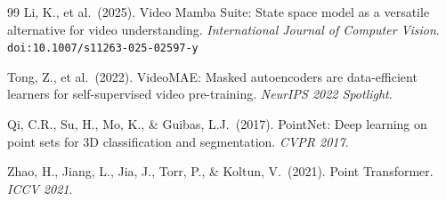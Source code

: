 \documentclass[11pt,letterpaper]{article}
\begin{document}
\begin{thebibliography}{99}
Li, K., et al.\ (2025).
Video Mamba Suite: State space model as a versatile alternative for video understanding.
\textit{International Journal of Computer Vision}.
\texttt{doi:10.1007/s11263-025-02597-y}

Tong, Z., et al.\ (2022).
VideoMAE: Masked autoencoders are data-efficient learners for self-supervised video pre-training.
\textit{NeurIPS 2022 Spotlight}.

Qi, C.R., Su, H., Mo, K., \& Guibas, L.J.\ (2017).
PointNet: Deep learning on point sets for 3D classification and segmentation.
\textit{CVPR 2017}.

Zhao, H., Jiang, L., Jia, J., Torr, P., \& Koltun, V.\ (2021).
Point Transformer.
\textit{ICCV 2021}.

\end{thebibliography}
\end{document}
